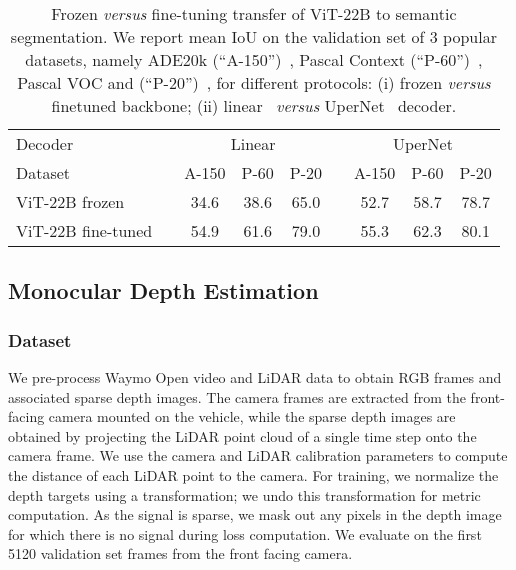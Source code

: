 \documentclass{article}
\newcommand{\chonk}{\mbox{ViT-22B}\xspace}
\begin{document}
\begin{table}[h]
    \caption{
{Frozen \textit{versus} fine-tuning transfer of \chonk to semantic segmentation.} 
We report mean IoU on the validation set of 3 popular datasets, namely ADE20k (``A-150'')~\citep{zhou2017scene}, Pascal Context (``P-60'')~\citep{mottaghi2014role}, Pascal VOC and (``P-20'')~\citep{everingham2010pascal}, for different protocols:
(i) frozen \textit{versus} finetuned backbone;
(ii) linear~\citep{strudel2021segmenter} \textit{versus} UperNet~\citep{xiao2018unified} decoder.
}
\centering
\begin{tabular}{@{} l c ccc c ccc @{}}
      \toprule
      Decoder && \multicolumn{3}{c}{Linear} && \multicolumn{3}{c}{UperNet} \\
\cmidrule{3-5}\cmidrule{7-9}
	      Dataset && A-150 & P-60 & P-20 && A-150 & P-60 & P-20 \\
      \midrule
      \chonk frozen && 34.6 & 38.6 & 65.0 && 52.7 & 58.7 & 78.7 \\
      \chonk fine-tuned\hspace{-1em} && 54.9 & 61.6 & 79.0 && 55.3 & 62.3 & 80.1\\
      \bottomrule
 \end{tabular}
\label{tab:semseg_frozen_finetune}
\end{table}




\subsection{Monocular Depth Estimation}
\label{app:de}

\subsubsection{Dataset}

We pre-process Waymo Open video and LiDAR data to obtain RGB frames and associated sparse depth images. The camera frames are extracted from the front-facing camera mounted on the vehicle, while the sparse depth images are obtained by projecting the LiDAR point cloud of a single time step onto the camera frame. We use the camera and LiDAR calibration parameters to compute the distance of each LiDAR point to the camera. For training, we normalize the depth targets using a  transformation; we undo this transformation for metric computation. As the signal is sparse, we mask out any pixels in the depth image for which there is no signal during loss computation.
We evaluate on the first 5120 validation set frames from the front facing camera.
\end{document}
